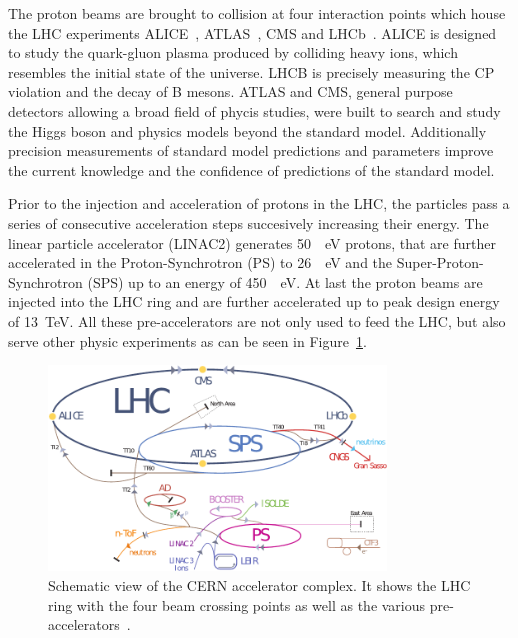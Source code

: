 The proton beams are brought to collision at four interaction points which house
the LHC experiments ALICE~\cite{ALICE}, ATLAS~\cite{ATLASa}, CMS and
LHCb~\cite{LHCb}. ALICE is designed to study the quark-gluon plasma produced by
colliding heavy ions, which resembles the initial state of the universe. LHCB is
precisely measuring the CP violation and the decay of B mesons. ATLAS and CMS,
general purpose detectors allowing a broad field of phycis studies, were built
to search and study the Higgs boson and physics models beyond the standard
model. Additionally precision measurements of standard model predictions and
parameters improve the current knowledge and the confidence of predictions of
the standard model.

Prior to the injection and acceleration of protons in the LHC, the particles
pass a series of consecutive acceleration steps succesively increasing their
energy. The linear particle accelerator (LINAC2) generates \SI{50}{\mega
\electronvolt} protons, that
are further accelerated in the Proton-Synchrotron (PS) to \SI{26}{\giga
\electronvolt} and
the Super-Proton-Synchrotron (SPS) up to an energy of \SI{450}{\giga
\electronvolt}. At last the proton beams are injected into the LHC ring and are
further accelerated up to peak design energy of \SI{13}{\tera\electronvolt}. All these
pre-accelerators are not only used to feed the LHC, but also serve other physic
experiments as can be seen in Figure~\ref{fig:lhc_complex}.

\begin{figure}[htp]
    \centering
    \includegraphics[width=0.8\textwidth]{figures/cms_detector/lhc_accelerator_chain.pdf}
    \caption[CERN accelerator complex]{Schematic view of the CERN
        accelerator complex. It shows the LHC ring  with the four beam crossing
        points as well as the various pre-accelerators~\cite{LHC:COMPLEX}.}
    \label{fig:lhc_complex}
\end{figure}

